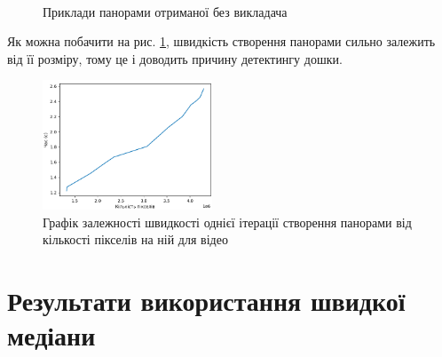 \begin{figure}[H]
    \centering
    \\
    \caption{Приклади панорами отриманої без викладача
    }
\end{figure}

Як можна побачити на рис. \ref{fig:panorama_stats_graph}, швидкість створення панорами сильно залежить
від її розміру, тому це і доводить причину детектингу дошки.

\begin{figure}[H]
    \centering
    \includegraphics[width=0.45\textwidth]{images/panorama_stats_graph}
    \caption{Графік залежності швидкості однієї ітерації створення панорами
        від кількості пікселів на ній для відео \cite{video:mfti:kombinatorika}
        \label{fig:panorama_stats_graph}
    }
\end{figure}

\section{Результати використання швидкої медіани}

